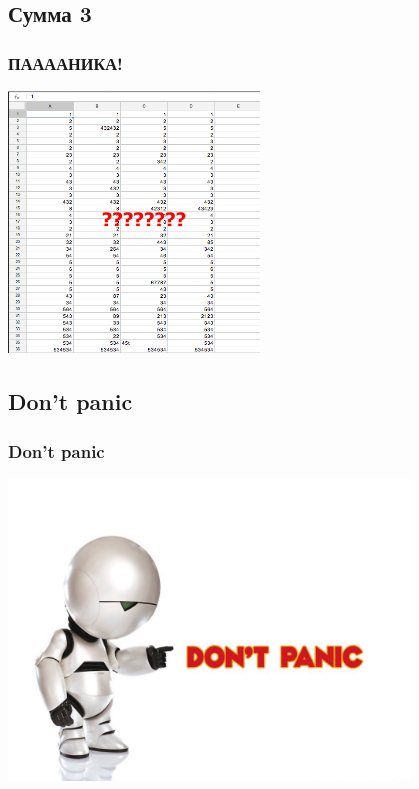 \documentclass[compress,red]{beamer}
\begin{document}
\subsection{Сумма 3}
\begin{frame}[fragile]
  \frametitle{ПААААНИКА!}
  \centerline{\includegraphics[width=0.5\textwidth]{images/07-2.png}}
\end{frame}

\subsection{Don't panic}
\begin{frame}[fragile]
  \frametitle{Don't panic}
  \centerline{\includegraphics[width=0.8\textwidth]{images/dont_panic.jpg}}
\end{frame}
\end{document}
